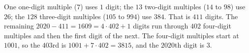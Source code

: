 One one-digit multiple ($7$) uses $1$ digit; the $13$ two-digit multiples ($14$ to $98$) use $26$; the $128$ three-digit multiples ($105$ to $994$) use $384$. That is $411$ digits. The remaining $2020-411=1609=4\cdot402+1$ digits run through $402$ four-digit multiples and then the first digit of the next. The four-digit multiples start at $1001$, so the $403$rd is $1001+7\cdot402=3815$, and the $2020$th digit is $\boxed{3}$.
